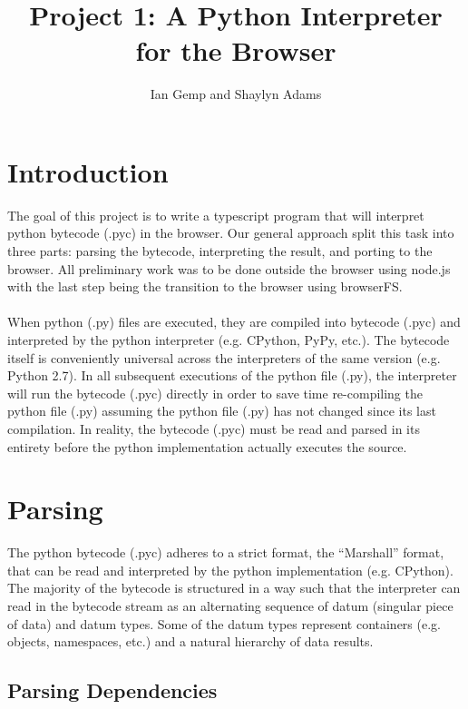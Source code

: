 \documentclass{article}
\begin{document}
\title{Project 1: A Python Interpreter for the Browser}
\author{Ian Gemp and Shaylyn Adams}
\maketitle

\section{Introduction}
The goal of this project is to write a typescript program that will interpret python bytecode (.pyc) in the browser.  Our general approach split this task into three parts: parsing the bytecode, interpreting the result, and porting to the browser.  All preliminary work was to be done outside the browser using node.js with the last step being the transition to the browser using browserFS.\\
\\
When python (.py) files are executed, they are compiled into bytecode (.pyc) and interpreted by the python interpreter (e.g. CPython, PyPy, etc.).  The bytecode itself is conveniently universal across the interpreters of the same version (e.g. Python 2.7).  In all subsequent executions of the python file (.py), the interpreter will run the bytecode (.pyc) directly in order to save time re-compiling the python file (.py) assuming the python file (.py) has not changed since its last compilation.  In reality, the bytecode (.pyc) must be read and parsed in its entirety before the python implementation actually executes the source.

\section{Parsing}

The python bytecode (.pyc) adheres to a strict format, the ``Marshall'' format, that can be read and interpreted by the python implementation (e.g. CPython).  The majority of the bytecode is structured in a way such that the interpreter can read in the bytecode stream as an alternating sequence of datum (singular piece of data) and datum types.  Some of the datum types represent containers (e.g. objects, namespaces, etc.) and a natural hierarchy of data results.

\subsection{Parsing Dependencies}
\end{document}
